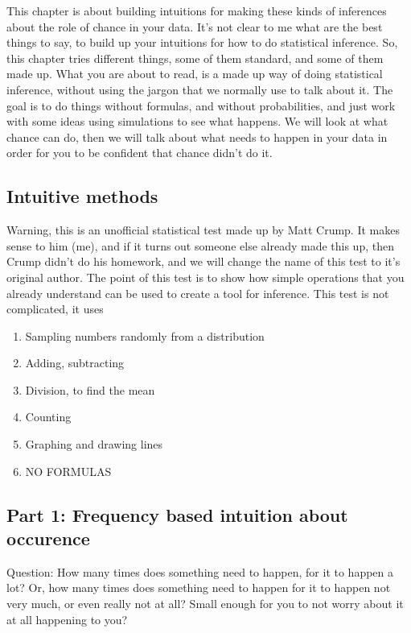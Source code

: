 \documentclass[]{book}
\providecommand{\tightlist}{%
  \setlength{\itemsep}{0pt}\setlength{\parskip}{0pt}}
\begin{document}
This chapter is about building intuitions for making these kinds of inferences about the role of chance in your data. It's not clear to me what are the best things to say, to build up your intuitions for how to do statistical inference. So, this chapter tries different things, some of them standard, and some of them made up. What you are about to read, is a made up way of doing statistical inference, without using the jargon that we normally use to talk about it. The goal is to do things without formulas, and without probabilities, and just work with some ideas using simulations to see what happens. We will look at what chance can do, then we will talk about what needs to happen in your data in order for you to be confident that chance didn't do it.

\hypertarget{intuitive-methods}{%
\subsection{Intuitive methods}\label{intuitive-methods}}

Warning, this is an unofficial statistical test made up by Matt Crump. It makes sense to him (me), and if it turns out someone else already made this up, then Crump didn't do his homework, and we will change the name of this test to it's original author. The point of this test is to show how simple operations that you already understand can be used to create a tool for inference. This test is not complicated, it uses

\begin{enumerate}
\def\labelenumi{\arabic{enumi}.}
\tightlist
\item
  Sampling numbers randomly from a distribution
\item
  Adding, subtracting
\item
  Division, to find the mean
\item
  Counting
\item
  Graphing and drawing lines
\item
  NO FORMULAS
\end{enumerate}

\hypertarget{part-1-frequency-based-intuition-about-occurence}{%
\subsection{Part 1: Frequency based intuition about occurence}\label{part-1-frequency-based-intuition-about-occurence}}

Question: How many times does something need to happen, for it to happen a lot? Or, how many times does something need to happen for it to happen not very much, or even really not at all? Small enough for you to not worry about it at all happening to you?
\end{document}
